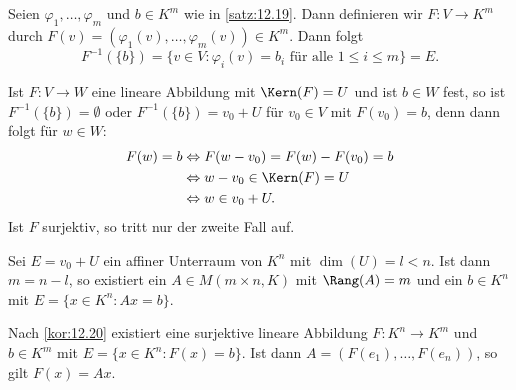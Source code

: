 \begin{beweis}
	Seien $\varphi_1,\dots,\varphi_m$ und $b \in K^m$ wie in \autoref{satz:12.19}.
	Dann definieren wir $F \colon V \rightarrow K^m$ durch $F(v) = (\varphi_1(v),\dots,\varphi_m(v)) \in K^m$.
	Dann folgt
	\[
		F^{-1}(\{b\}) = \{v \in V : \varphi_i(v) = b_i \text{ für alle } 1 \leq i \leq m\} = E. 
	\]
\end{beweis}

\begin{bemerkung}
	\label{bem:12.21}
	Ist $F \colon V \rightarrow W$ eine lineare Abbildung mit $\Kern(F) = U$ und ist $b \in W$ fest, so ist $F^{-1}(\{b\}) = \emptyset$ oder $F^{-1}(\{b\}) = v_0 + U$ für $v_0 \in V$ mit $F(v_0) = b$, denn dann folgt für $w \in W$:
	\begin{align*}
		F(w) = b &\Leftrightarrow F(w-v_0) = F(w) - F(v_0) = b \\
		&\Leftrightarrow w-v_0 \in \Kern(F) = U \\
		&\Leftrightarrow w \in v_0 + U.
	\end{align*}
	Ist $F$ surjektiv, so tritt nur der zweite Fall auf.
\end{bemerkung}

\begin{korollar}
	\label{kor:12.22}
	Sei $E = v_0 + U$ ein affiner Unterraum von $K^n$ mit $\dim(U) = l < n$.
	Ist dann $m = n-l$, so existiert ein $A \in M(m \times n,K)$ mit $\Rang(A) = m$ und ein $b \in K^n$ mit $E = \{x \in K^n : Ax = b\}$.
\end{korollar}

\begin{beweis}
	Nach \autoref{kor:12.20} existiert eine surjektive lineare Abbildung $F \colon K^n \rightarrow K^m$ und $b \in K^m$ mit $E = \{x \in K^n : F(x) = b\}$.
	Ist dann $A = (F(e_1),\dots,F(e_n))$, so gilt $F(x) = Ax$. 
\end{beweis}

